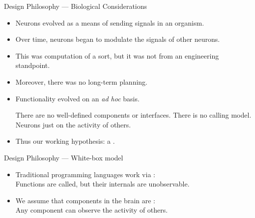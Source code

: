    \begin{frame}{Design Philosophy --- Biological Considerations}
      \begin{itemize}
         \item Neurons evolved as a means of sending signals in an organism.
         \medskip
         \item Over time, neurons began to modulate the signals of other neurons.
         \medskip
         \item This was computation of a sort, but it was not  from an engineering standpoint.
         \medskip
         \item Moreover, there was no long-term planning.
         \medskip
         \item Functionality evolved on an \emph{ad hoc} basis.
         
         \vspace{2mm}
         
         \resitem There are no well-defined components or interfaces.
         \resitem There is no calling model.\\
         \resitem Neurons just  on the activity of others.
         
         \pause
         \medskip
         \item Thus our working hypothesis: a .
      \end{itemize}
   \end{frame}
   
   \begin{frame}{Design Philosophy --- White-box model}
      \begin{itemize}
         \item Traditional programming languages work via :\\
         \vspace{2mm}
         Functions are called, but their internals are unobservable.
         \vspace{4mm}
         \item We assume that components in the brain are :\\
         \vspace{2mm}
         Any component can observe the activity of others.
      \end{itemize}
   \end{frame}
   
